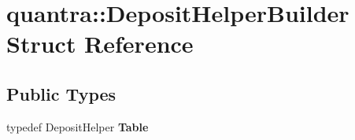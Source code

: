 \hypertarget{structquantra_1_1DepositHelperBuilder}{}\section{quantra\+:\+:Deposit\+Helper\+Builder Struct Reference}
\label{structquantra_1_1DepositHelperBuilder}
\subsection*{Public Types}
\begin{DoxyCompactItemize}
\item 
\mbox{\label{structquantra_1_1DepositHelperBuilder_adbf1d1201e0d4eee850c346178bd9d1b}} 
typedef Deposit\+Helper {\bfseries Table}
\end{DoxyCompactItemize}
